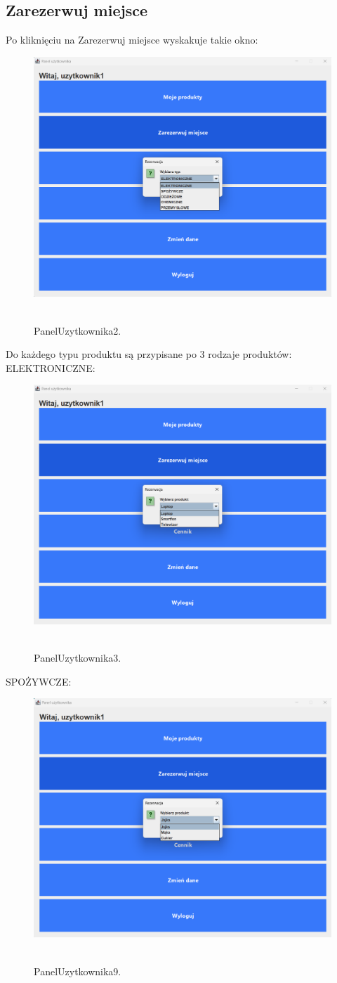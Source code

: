\subsection{Zarezerwuj miejsce}
\label{subsec:Zarezerwuj miejsce}
Po kliknięciu na Zarezerwuj miejsce wyskakuje takie okno:
\begin{figure}[H]
    \centering
    \includegraphics[width=.7\linewidth]{figures/PanelUzytkownika2.png}\
    \caption{PanelUzytkownika2.\label{PanelUzytkownika2}}
\end{figure}
Do każdego typu produktu są przypisane po 3 rodzaje produktów:
ELEKTRONICZNE:
\begin{figure}[H]
    \centering
    \includegraphics[width=.7\linewidth]{figures/PanelUzytkownika3.png}\
    \caption{PanelUzytkownika3.\label{PanelUzytkownika3}}
\end{figure}
SPOŻYWCZE:
\begin{figure}[H]
    \centering
    \includegraphics[width=.7\linewidth]{figures/PanelUzytkownika9.png}\
    \caption{PanelUzytkownika9.\label{PanelUzytkownika9}}
\end{figure}
